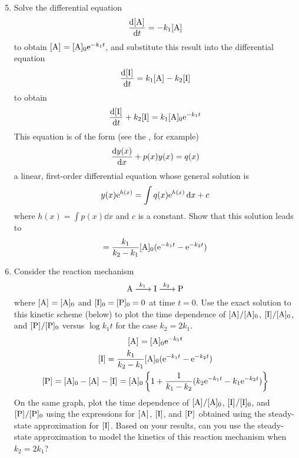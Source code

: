 \documentclass[../psets.tex]{subfiles}
\begin{document}
\begin{enumerate}[label={\textbf{29-\arabic*.}},leftmargin=3.5em]
    \setcounter{enumi}{4}
    \item Solve the differential equation
    \begin{equation*}
        \dv{\cnc{A}}{t} = -k_1\cnc{A}
    \end{equation*}
    to obtain $\cnc{A}=\cnc[0]{A}\e[-k_1t]$, and substitute this result into the differential equation
    \begin{equation*}
        \dv{\cnc{I}}{t} = k_1\cnc{A}-k_2\cnc{I}
    \end{equation*}
    to obtain
    \begin{equation*}
        \dv{\cnc{I}}{t}+k_2\cnc{I} = k_1\cnc[0]{A}\e[-k_1t]
    \end{equation*}
    This equation is of the form (see the \textcite{bib:CRCTables}, for example)
    \begin{equation*}
        \dv{y(x)}{x}+p(x)y(x) = q(x)
    \end{equation*}
    a linear, first-order differential equation whose general solution is
    \begin{equation*}
        y(x)\e[h(x)] = \int q(x)\e[h(x)]\dd{x}+c
    \end{equation*}
    where $h(x)=\int p(x)\dd{x}$ and $c$ is a constant. Show that this solution leads to
    \begin{equation*}
        [\ce{I}] = \frac{k_1}{k_2-k_1}\cnc[0]{A}(\e[-k_1t]-\e[-k_2t])
    \end{equation*}
    \item Consider the reaction mechanism
    \begin{equation*}
        \ce{A ->[$k_1$] I ->[$k_2$] P}
    \end{equation*}
    where $\cnc{A}=\cnc[0]{A}$ and $\cnc[0]{I}=\cnc[0]{P}=0$ at time $t=0$. Use the exact solution to this kinetic scheme (below) to plot the time dependence of $\cnc{A}/\cnc[0]{A}$, $\cnc{I}/\cnc[0]{A}$, and $\cnc{P}/\cnc[0]{P}$ versus $\log k_1t$ for the case $k_2=2k_1$.
    \begin{gather*}
        \cnc{A} = \cnc[0]{A}\e[-k_1t]\\
        [\ce{I}] = \frac{k_1}{k_2-k_1}\cnc[0]{A}(\e[-k_1t]-\e[-k_2t])\\
        \cnc{P} = \cnc[0]{A}-\cnc{A}-\cnc{I} = \cnc[0]{A}\left\{ 1+\frac{1}{k_1-k_2}(k_2\e[-k_1t]-k_1\e[-k_2t]) \right\}
    \end{gather*}
    On the same graph, plot the time dependence of $\cnc{A}/\cnc[0]{A}$, $\cnc{I}/\cnc[0]{I}$, and $\cnc{P}/\cnc[0]{P}$ using the expressions for $\cnc{A}$, $\cnc{I}$, and $\cnc{P}$ obtained using the steady-state approximation for $\cnc{I}$. Based on your results, can you use the steady-state approximation to model the kinetics of this reaction mechanism when $k_2=2k_1$?
\end{enumerate}
\end{document}
